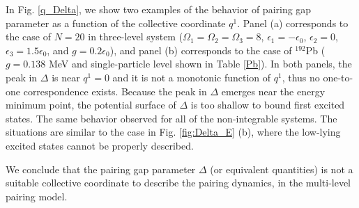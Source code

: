 \documentclass[11pt]{book} %
\begin{document}
In Fig. \ref{q_Delta}, we show two examples of the behavior of pairing gap parameter as a function of the collective coordinate $q^1$.
Panel (a) corresponds to the case of $N=20$ in three-level system ($\Omega_1=\Omega_2=\Omega_3=8$,
$\epsilon_1=-\epsilon_0$, $\epsilon_2=0$, $\epsilon_3=1.5\epsilon_0$,
and $g=0.2\epsilon_0$), and panel (b) corresponds to the case of ${}^{192}$Pb ($g=0.138$ MeV and single-particle level shown in Table \ref{Pb}).
In both panels, the peak in $\Delta$ is near $q^1=0$ and it is not a monotonic
function of $q^1$, thus no one-to-one correspondence exists. 
Because the peak in $\Delta$ emerges near the energy minimum point, the potential surface of $\Delta$ is too shallow to bound first excited states. 
The same behavior observed for all of the non-integrable systems.
The situations are similar to the case in Fig. \ref{fig:Delta_E} (b), where the low-lying excited states cannot be properly described.

We conclude that the pairing gap parameter $\Delta$ (or equivalent quantities) is not a suitable collective coordinate to describe the pairing dynamics, in the multi-level pairing model. 



\end{document}
